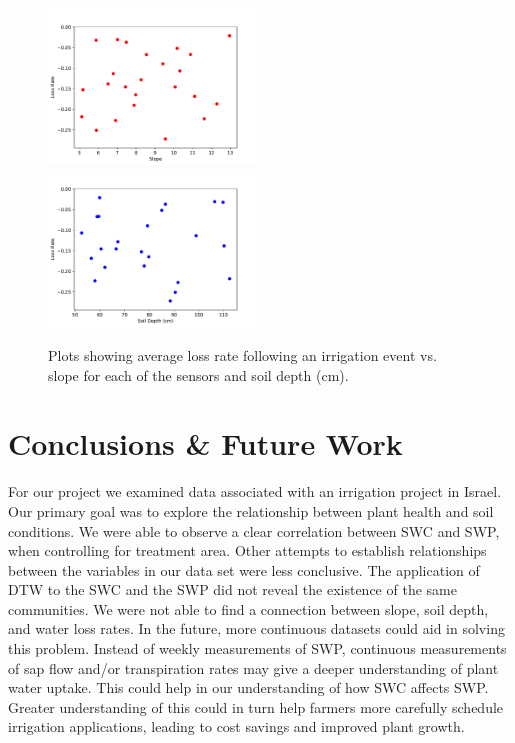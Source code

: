 \documentclass[12pt]{scrartcl}
\begin{document}
\begin{figure}[!htb]
    \centering
    \includegraphics[width=0.495\textwidth]{figures/slope_loss.pdf}
    \includegraphics[width=0.495\textwidth]{figures/soil_depth_loss.pdf}
    \caption{Plots showing average loss rate following an irrigation event vs. slope for each of the sensors and soil depth (cm).}
    \label{fig:slope}
\end{figure}

\section{Conclusions \& Future Work}
For our project we examined data associated with an irrigation project in Israel. Our primary goal was to explore the relationship between plant health and soil conditions. We were able to observe a clear correlation between SWC and SWP, when controlling for treatment area. Other attempts to establish relationships between the variables in our data set were less conclusive. The application of DTW to the SWC and the SWP did not reveal the existence of the same communities. We were not able to find a connection between slope, soil depth, and water loss rates. In the future, more continuous datasets could aid in solving this problem. Instead of weekly measurements of SWP, continuous measurements of sap flow and/or transpiration rates may give a deeper understanding of plant water uptake. This could help in our understanding of how SWC affects SWP. Greater understanding of this could in turn help farmers more carefully schedule irrigation applications, leading to cost savings and improved plant growth.
\end{document}
